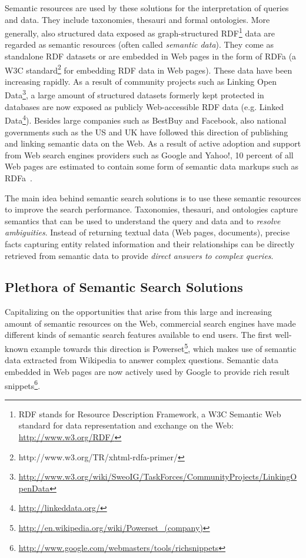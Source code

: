 Semantic resources are used by these solutions for the interpretation of queries and data. They include taxonomies, thesauri and formal ontologies. 
More generally, also structured data exposed as graph-structured RDF\footnote{RDF stands for Resource Description Framework, a W3C Semantic Web standard for data representation and exchange on the Web: \url{http://www.w3.org/RDF/}} data are regarded as semantic resources (often called \emph{semantic data}). They come as standalone RDF datasets or are embedded in Web pages in the form of RDFa (a W3C standard\footnote{http://www.w3.org/TR/xhtml-rdfa-primer/} for embedding RDF data in Web pages). These data have been increasing rapidly. As a result of community projects such as Linking Open Data\footnote{\url{http://www.w3.org/wiki/SweoIG/TaskForces/CommunityProjects/LinkingOpenData}}, a large amount of structured datasets formerly kept protected in databases are now exposed as publicly Web-accessible RDF data (e.g. Linked Data\footnote{\url{http://linkeddata.org/}}). Besides large companies such as BestBuy and Facebook, also national governments such as the US and UK have followed this direction of publishing and linking semantic data on the Web. As a result of active adoption and support from Web search engines providers such as Google and Yahoo!, 10 percent of all Web pages are estimated to contain some form of semantic data markups such as RDFa~\cite{}. 

The main idea behind semantic search solutions is to use these semantic resources to improve the search performance. Taxonomies, thesauri, and ontologies capture semantics that can be used to understand the query and data and to \emph{resolve ambiguities}. Instead of returning textual data (Web pages, documents), precise facts capturing entity related information and their relationships can be directly retrieved from semantic data to provide \emph{direct answers to complex queries}. 

\subsection{Plethora of Semantic Search Solutions}
Capitalizing on the opportunities that arise from this large and increasing amount of semantic resources on the Web, commercial search engines have made different kinds of semantic search features available to end users. The first well-known example towards this direction is Powerset\footnote{\url{http://en.wikipedia.org/wiki/Powerset_(company)}}, which makes use of semantic data extracted from Wikipedia to answer complex questions. Semantic data embedded in Web pages are now actively used by Google to provide rich result snippets\footnote{\url{http://www.google.com/webmasters/tools/richsnippets}}. 

